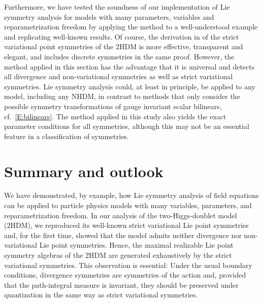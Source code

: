 \documentclass[a4paper,hidelinks, 12pt]{article}
\numberwithin{equation}{section}
\theoremstyle{plain}
\begin{document}
Furthermore, we have tested the soundness of our implementation of Lie symmetry analysis for models with many parameters, variables and reparametrization freedom by applying the method to a well-understood example and replicating well-known results. Of course, the derivation in \cite{PhysRevD.77.015017} of the strict variational point symmetries of the 2HDM is more effective, transparent and elegant, and includes discrete symmetries in the same proof. However, the method applied in this section has the advantage that it is universal and detects all divergence and non-variational symmetries as well as strict variational symmetries. Lie symmetry analysis could, at least in principle, be applied to any model, including any NHDM, in contrast to methods that only consider the possible symmetry transformations of gauge invariant scalar bilinears, cf.~\eqref{E:bilinears}. The method applied in this study also yields the exact parameter conditions for all symmetries, although this may not be an essential feature in a classification of symmetries. 


	






\section{Summary and outlook}
\label{sec:SummaryAndOutlook}

We have demonstrated, by example, how Lie symmetry analysis of field equations
can be applied to particle physics models with many variables, parameters, and
reparametrization freedom. In our analysis of the two-Higgs-doublet model
(2HDM), we reproduced its well-known strict variational Lie point symmetries
and, for the first time, showed that the model admits neither divergence nor
non-variational Lie point symmetries. Hence, the maximal realizable Lie point symmetry algebras of the 2HDM are
generated exhaustively by the strict variational symmetries.
This observation is essential: Under the usual boundary conditions, divergence
symmetries are symmetries of the action and, provided that the path-integral
measure is invariant, they should be preserved under quantization in
the same way as strict variational symmetries.
  
\end{document}
